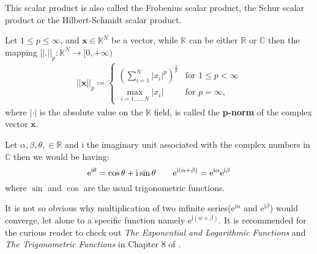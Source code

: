 \noindent This scalar product is also called the Frobenius scalar product, the Schur scalar product or 
the Hilbert-Schmidt scalar product.

\begin{Def}\label{def:p-norm}
    Let $1 \leq p \leq \infty$, and $\boldsymbol{x} \in \mathbb{K}^N$ be a vector, while $\mathbb{K}$ can be either $\mathbb{R}$ or $\mathbb{C}$ then the mapping $\left|\left| \boldsymbol{.} \right|\right|_p \colon \mathbb{K}^N \to [0,+\infty)$
    \begin{equation}
        \begin{split} 
            \left|\left|\boldsymbol{x}\right|\right|_p \coloneqq    
            \begin{cases}
                \left(\sum_{i=1}^{N}\left|x_i\right|^p\right)^{\frac{1}{p}} & \text{for } 1 \leq p < \infty\\
                \underset{{i=1,\dots,N}}{\max} \left|x_i\right| & \text{for } p = \infty,
            \end{cases}
        \end{split}
    \end{equation}
    where $\left|\boldsymbol{\cdot}\right|$ is the absolute value on the $\mathbb{K}$ field,
    is called the \textbf{p-norm} of the complex vector $\boldsymbol{x}$.
\end{Def}
\begin{Thm}\label{theorem:euler_formula}
    Let $\alpha,\beta,\theta, \in \mathbb{R}$ and $\mathrm{i}$ the imaginary unit associated with the complex numbers in $\mathbb{C}$ 
    then we would be having:
	\begin{equation}
		\mathrm{e}^{\mathrm{i}\theta} = \cos \theta +  \mathrm{i}\sin \theta \qquad  \mathrm{e}^{\mathrm{i}(\alpha+\beta)} = \mathrm{e}^{\mathrm{i}\alpha}\mathrm{e}^{\mathrm{i}\beta}\index{Euler formula}\index{Function!$\exp$}\index{Function!$\sin$}\index{Function!$\cos$}
	\end{equation}
    where $\sin$ and $\cos$ are the usual trigonometric functions.
	\end{Thm}
	\begin{Rem}
	It is not so obvious why multiplication of two infinite series($\mathrm{e}^{\mathrm{i}\alpha}$ and $\mathrm{e}^{\mathrm{i}\beta}$) would converge, let alone to a specific function namely  $\mathrm{e}^{\mathrm{i}(\alpha+\beta)}$.
    It is recommended for the curious reader to check out \emph{The Exponential and Logarithmic Functions} and \emph{The Trigonometric Functions} in Chapter 8 of \cite{Rudin1976}. 
	\end{Rem}
